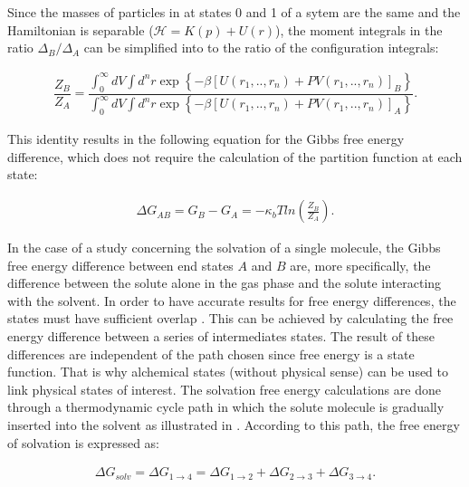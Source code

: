 	Since the masses of particles in at states 0 and 1 of a sytem are the same and the Hamiltonian is separable ($\mathcal{H} = K(p) + U(r)$), the moment integrals in the ratio ${\Delta_{B}}/{\Delta_{A}}$ can be simplified into to the ratio of the configuration integrals:
	
	\begin{equation}
	\label{eq:partiso}
	\begin{aligned}
	\dfrac{Z_{B}}{Z_{A}} = \dfrac{\int_{0}^{\infty} dV \int d^{n}r \exp \left\lbrace -\beta \left[U(r_{1},..,r_{n}) + PV(r_{1},..,r_{n}) \right]_{B} \right\rbrace}{\int_{0}^{\infty} dV \int d^{n}r \exp \left\lbrace  -\beta \left[U(r_{1},..,r_{n}) + PV(r_{1},..,r_{n}) \right]_{A} \right\rbrace }.
	\end{aligned}
	\end{equation}
	
	This identity results in the following equation for the Gibbs free energy difference, which does not  require the calculation of the partition function at each state:
	
	\begin{equation}
	\label{eq:dif}
	\begin{aligned}
	\Delta G_{AB} = G_{B} - G_{A}= -\kappa_{b}T ln \left( \frac{Z_{B}}{Z_{A}}\right).
	\end{aligned}
	\end{equation}
	
	In the case of a study concerning the solvation of a single molecule, the Gibbs free energy difference between end states $A$ and $B$ are, more specifically, the difference between the solute alone in the gas phase and the solute interacting with the solvent. In order to have accurate results for free energy differences, the states must have sufficient overlap  \cite{klimovich}. This can be achieved by calculating the free energy difference between a series of intermediates states. The result of these differences are independent of the path chosen since free energy is a state function. That is why alchemical states (without physical sense) can be used to link physical states of interest. The solvation free energy calculations are done through a thermodynamic cycle path in which the solute molecule is gradually inserted into the solvent as illustrated in . According to this path, the free energy of solvation is expressed as:
	
	\begin{equation}
	\label{eq:freesolv}
	\begin{aligned}
	\Delta G_{solv} = \Delta G_{1 \rightarrow 4} = \Delta G_{1 \rightarrow 2} + \Delta G_{2 \rightarrow 3} + \Delta G_{3 \rightarrow 4}  .
	\end{aligned}
	\end{equation}
	
